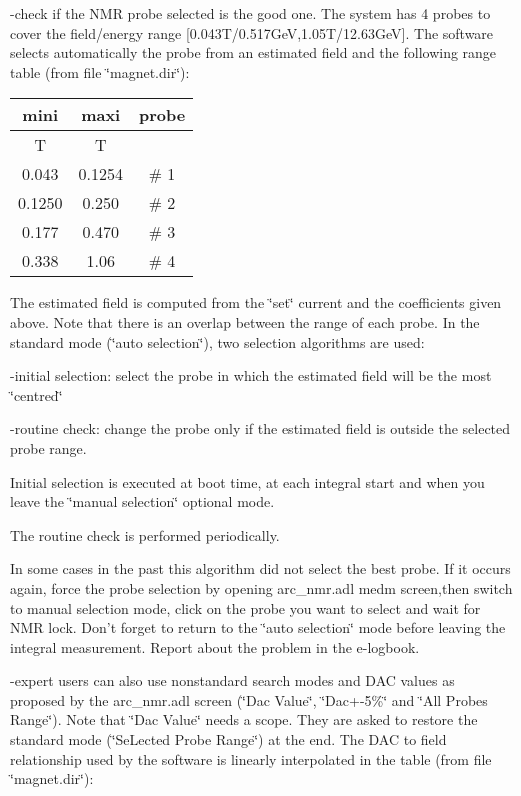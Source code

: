 -check if the NMR probe selected is the good one. The system has 4 probes to
cover the field/energy range {[}0.043T/0.517GeV,1.05T/12.63GeV{]}. The software
selects automatically the probe from an estimated field and the following range
table (from file \char`\"{}magnet.dir\char`\"{}): 

\vspace{0.3cm}
{\centering \begin{tabular}{|c|c|c|}
\hline 
mini&
maxi&
probe\\
\hline 
\hline 
T&
T&
\\
\hline 
0.043&
0.1254&
\# 1\\
\hline 
0.1250&
0.250&
\# 2\\
\hline 
0.177&
0.470&
\# 3\\
\hline 
0.338&
1.06&
\# 4\\
\hline 
\end{tabular}\par}
\vspace{0.3cm}

The estimated field is computed from the \char`\"{}set\char`\"{} current and
the coefficients given above. Note that there is an overlap between the range
of each probe. In the standard mode (\char`\"{}auto selection\char`\"{}), two
selection algorithms are used: 

-initial selection: select the probe in which the estimated field will be the
most \char`\"{}centred\char`\"{} 

-routine check: change the probe only if the estimated field is outside the
selected probe range. 

Initial selection is executed at boot time, at each integral start and when
you leave the \char`\"{}manual selection\char`\"{} optional mode. 

The routine check is performed periodically. 

In some cases in the past this algorithm did not select the best probe. If it
occurs again, force the probe selection by opening arc\_nmr.adl medm screen,then
switch to manual selection mode, click on the probe you want to select and wait
for NMR lock. Don't forget to return to the \char`\"{}auto selection\char`\"{}
mode before leaving the integral measurement. Report about the problem in the
e-logbook. 

-expert users can also use nonstandard search modes and DAC values as proposed
by the arc\_nmr.adl screen (\char`\"{}Dac Value\char`\"{}, \char`\"{}Dac+-5\%\char`\"{}
and \char`\"{}All Probes Range\char`\"{}). Note that \char`\"{}Dac Value\char`\"{}
needs a scope. They are asked to restore the standard mode (\char`\"{}SeLected
Probe Range\char`\"{}) at the end. The DAC to field relationship used by the
software is linearly interpolated in the table (from file \char`\"{}magnet.dir\char`\"{}): 

